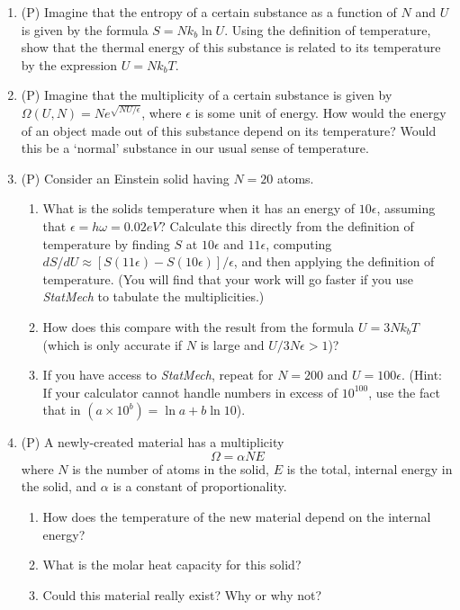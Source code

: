 \begin{enumerate}
\item (P) Imagine that the entropy of a certain substance as a function of 
$N$ and $U$ is given by the formula $S = Nk_b \ln U$. Using the definition of temperature, 
show that the thermal energy of this substance is related to its temperature 
by the expression $U=Nk_b T$.

\item (P) Imagine that the multiplicity of a certain substance is 
given by $\Omega(U,N) = Ne^{\sqrt{NU/\epsilon}}$, where $\epsilon$ is some unit of energy.  
How would the energy of an object made out of this substance depend 
on its temperature?  Would this be a `normal' substance in our usual sense 
of temperature.

\item (P) Consider an Einstein solid having $N = 20$ atoms.  
\begin{enumerate}
\item What is the solids temperature when it has an energy of $10\epsilon$, 
assuming that $\epsilon =h\omega = 0.02 eV$?  Calculate this directly from the 
definition of temperature by finding $S$ at $10\epsilon$ and $11\epsilon$, computing 
$dS/dU \approx [S(11\epsilon) - S(10\epsilon)]/\epsilon$, and then applying 
the definition of temperature.  (You will find that your work will 
go faster if you use {\it StatMech} to tabulate the multiplicities.)
\item How does this compare with the result from the formula $U = 3Nk_bT$ 
(which is only accurate if $N$ is large and $U/3N\epsilon > 1$)?
\item If you have access to {\it StatMech}, repeat for 
$N = 200$ and $U =100\epsilon$.  
(Hint:  If your calculator cannot handle numbers in excess of $10^{100}$, 
use the fact that in $(a \times 10^b) = \ln a + b \ln 10 $).
\end{enumerate}

\item (P)  A newly-created material has a multiplicity
$$
\Omega = \alpha N E
$$
where $N$ is the number of atoms in the solid,
$E$ is the total, internal energy in the solid, and $\alpha$ is a constant of 
proportionality.
\begin{enumerate}
\item How does the temperature of the new material depend on the internal energy?
\item What is the molar heat capacity for this solid?
\item Could this material really exist? Why or why not?
\end{enumerate}


\end{enumerate}
